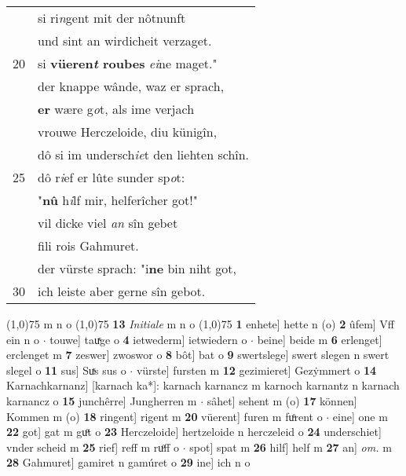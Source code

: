 \documentclass[8pt,a4paper,notitlepage]{article}
\begin{document}
\begin{table}[ht]
\begin{minipage}[t]{0.5\linewidth}
\begin{tabular}{rl}
 & si ri\textit{n}gent mit der nôtnunft\\ 
 & und sint an wirdicheit verzaget.\\ 
20 & si \textbf{vüeren\textit{t} roubes} \textit{ei}ne maget."\\ 
 & der knappe wânde, waz er sprach,\\ 
 & \textbf{er} wære g\textit{o}t, als ime verjach\\ 
 & vrouwe Herczeloide, diu künigîn,\\ 
 & dô si im undersch\textit{ie}t den liehten schîn.\\ 
25 & dô r\textit{i}ef er lûte sunder sp\textit{o}t:\\ 
 & "\textbf{nû} h\textit{i}lf mir, helferîcher got!"\\ 
 & vil dicke viel \textit{an} sîn gebet\\ 
 & fili rois Gahmuret.\\ 
 & der vürste sprach: "i\textbf{ne} bin niht got,\\ 
30 & ich leiste aber gerne sîn gebot.\\ 
\end{tabular}
\scriptsize
\line(1,0){75} \newline
m n o \newline
\line(1,0){75} \newline
\textbf{13} \textit{Initiale} m n o  \newline
\line(1,0){75} \newline
\textbf{1} enhete] hette n (o) \textbf{2} ûfem] Vff ein n o  $\cdot$ touwe] tauͯge o \textbf{4} ietwederm] ietwiedern o  $\cdot$ beine] beide m \textbf{6} erlenget] erclenget m \textbf{7} zeswer] zwoswor o \textbf{8} bôt] bat o \textbf{9} swertslege] swert slegen n swert slegel o \textbf{11} sus] Suͯs sus o  $\cdot$ vürste] fursten m \textbf{12} gezimieret] Gezẏmmert o \textbf{14} Karnachkarnanz] [karnach ka*]: karnach karnancz m karnoch karnantz n karnach karnancz o \textbf{15} junchêrre] Jungherren m  $\cdot$ sâhet] sehent m (o) \textbf{17} können] Kommen m (o) \textbf{18} ringent] rigent m \textbf{20} vüerent] furen m fuͦrent o  $\cdot$ eine] one m \textbf{22} got] gat m guͦt o \textbf{23} Herczeloide] hertzeloide n herczeleid o \textbf{24} underschiet] vnder scheid m \textbf{25} rief] reff m ruͦff o  $\cdot$ spot] spat m \textbf{26} hilf] helf m \textbf{27} an] \textit{om.} m \textbf{28} Gahmuret] gamiret n gamúret o \textbf{29} ine] ich n o \newline
\end{minipage}
\end{table}
\end{document}
